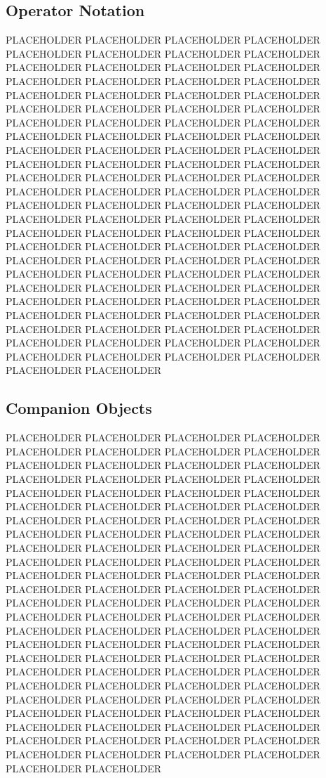 \subsection{Operator Notation}

PLACEHOLDER PLACEHOLDER PLACEHOLDER PLACEHOLDER PLACEHOLDER PLACEHOLDER PLACEHOLDER PLACEHOLDER PLACEHOLDER PLACEHOLDER PLACEHOLDER PLACEHOLDER PLACEHOLDER PLACEHOLDER PLACEHOLDER PLACEHOLDER PLACEHOLDER PLACEHOLDER PLACEHOLDER PLACEHOLDER PLACEHOLDER PLACEHOLDER PLACEHOLDER PLACEHOLDER PLACEHOLDER PLACEHOLDER PLACEHOLDER PLACEHOLDER PLACEHOLDER PLACEHOLDER PLACEHOLDER PLACEHOLDER PLACEHOLDER PLACEHOLDER PLACEHOLDER PLACEHOLDER PLACEHOLDER PLACEHOLDER PLACEHOLDER PLACEHOLDER PLACEHOLDER PLACEHOLDER PLACEHOLDER PLACEHOLDER PLACEHOLDER PLACEHOLDER PLACEHOLDER PLACEHOLDER PLACEHOLDER PLACEHOLDER PLACEHOLDER PLACEHOLDER PLACEHOLDER PLACEHOLDER PLACEHOLDER PLACEHOLDER PLACEHOLDER PLACEHOLDER PLACEHOLDER PLACEHOLDER PLACEHOLDER PLACEHOLDER PLACEHOLDER PLACEHOLDER PLACEHOLDER PLACEHOLDER PLACEHOLDER PLACEHOLDER PLACEHOLDER PLACEHOLDER PLACEHOLDER PLACEHOLDER PLACEHOLDER PLACEHOLDER PLACEHOLDER PLACEHOLDER PLACEHOLDER PLACEHOLDER PLACEHOLDER PLACEHOLDER PLACEHOLDER PLACEHOLDER PLACEHOLDER PLACEHOLDER PLACEHOLDER PLACEHOLDER PLACEHOLDER PLACEHOLDER PLACEHOLDER PLACEHOLDER PLACEHOLDER PLACEHOLDER PLACEHOLDER PLACEHOLDER PLACEHOLDER PLACEHOLDER PLACEHOLDER PLACEHOLDER

\subsection{Companion Objects}

PLACEHOLDER PLACEHOLDER PLACEHOLDER PLACEHOLDER PLACEHOLDER PLACEHOLDER PLACEHOLDER PLACEHOLDER PLACEHOLDER PLACEHOLDER PLACEHOLDER PLACEHOLDER PLACEHOLDER PLACEHOLDER PLACEHOLDER PLACEHOLDER PLACEHOLDER PLACEHOLDER PLACEHOLDER PLACEHOLDER PLACEHOLDER PLACEHOLDER PLACEHOLDER PLACEHOLDER PLACEHOLDER PLACEHOLDER PLACEHOLDER PLACEHOLDER PLACEHOLDER PLACEHOLDER PLACEHOLDER PLACEHOLDER PLACEHOLDER PLACEHOLDER PLACEHOLDER PLACEHOLDER PLACEHOLDER PLACEHOLDER PLACEHOLDER PLACEHOLDER PLACEHOLDER PLACEHOLDER PLACEHOLDER PLACEHOLDER PLACEHOLDER PLACEHOLDER PLACEHOLDER PLACEHOLDER PLACEHOLDER PLACEHOLDER PLACEHOLDER PLACEHOLDER PLACEHOLDER PLACEHOLDER PLACEHOLDER PLACEHOLDER PLACEHOLDER PLACEHOLDER PLACEHOLDER PLACEHOLDER PLACEHOLDER PLACEHOLDER PLACEHOLDER PLACEHOLDER PLACEHOLDER PLACEHOLDER PLACEHOLDER PLACEHOLDER PLACEHOLDER PLACEHOLDER PLACEHOLDER PLACEHOLDER PLACEHOLDER PLACEHOLDER PLACEHOLDER PLACEHOLDER PLACEHOLDER PLACEHOLDER PLACEHOLDER PLACEHOLDER PLACEHOLDER PLACEHOLDER PLACEHOLDER PLACEHOLDER PLACEHOLDER PLACEHOLDER PLACEHOLDER PLACEHOLDER PLACEHOLDER PLACEHOLDER PLACEHOLDER PLACEHOLDER PLACEHOLDER PLACEHOLDER PLACEHOLDER PLACEHOLDER PLACEHOLDER PLACEHOLDER

